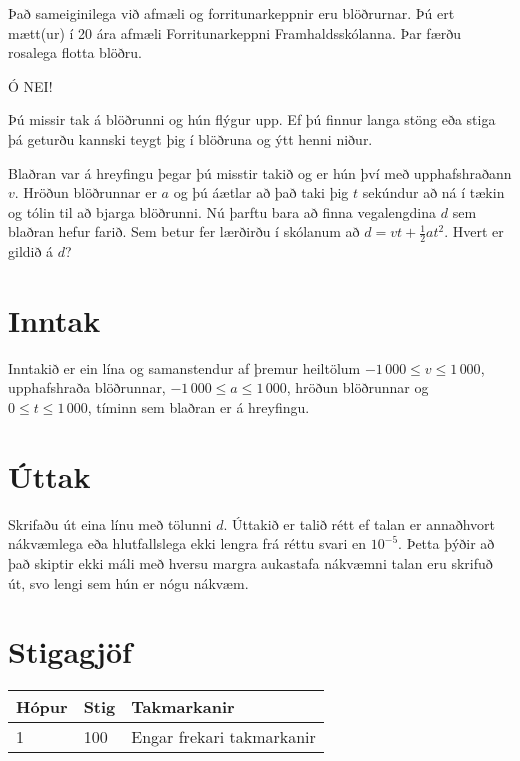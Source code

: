 
Það sameiginilega við afmæli og forritunarkeppnir eru blöðrurnar.
Þú ert mætt(ur) í 20 ára afmæli Forritunarkeppni Framhaldsskólanna.
Þar færðu rosalega flotta blöðru.

Ó NEI!

Þú missir tak á blöðrunni og hún flýgur upp.
Ef þú finnur langa stöng eða stiga þá geturðu kannski teygt þig í
blöðruna og ýtt henni niður.

Blaðran var á hreyfingu þegar þú misstir takið og er hún því með upphafshraðann $v$.
Hröðun blöðrunnar er $a$ og þú áætlar að það taki þig $t$ sekúndur að ná í tækin
og tólin til að bjarga blöðrunni.
Nú þarftu bara að finna vegalengdina $d$ sem blaðran hefur farið.
Sem betur fer lærðirðu í skólanum að $d = vt + \frac{1}{2}at^2$.
Hvert er gildið á $d$?

\section*{Inntak}
Inntakið er ein lína og samanstendur af þremur heiltölum $-1\,000 \leq v \leq 1\,000$, upphafshraða blöðrunnar,
$-1\,000 \leq a \leq 1\,000$, hröðun blöðrunnar og $0 \leq t \leq 1\,000$, tíminn sem blaðran er á hreyfingu.

\section*{Úttak}
Skrifaðu út eina línu með tölunni $d$.
Úttakið er talið rétt ef talan er annaðhvort nákvæmlega eða hlutfallslega ekki 
lengra frá réttu svari en $10^{-5}$. Þetta þýðir að það skiptir ekki máli með hversu 
margra aukastafa nákvæmni talan eru skrifuð út, svo lengi sem hún er nógu nákvæm.

\section*{Stigagjöf}
\begin{tabular}{|l|l|l|}
\hline
Hópur & Stig & Takmarkanir \\ \hline
1     & 100   & Engar frekari takmarkanir\\ \hline
\end{tabular}

